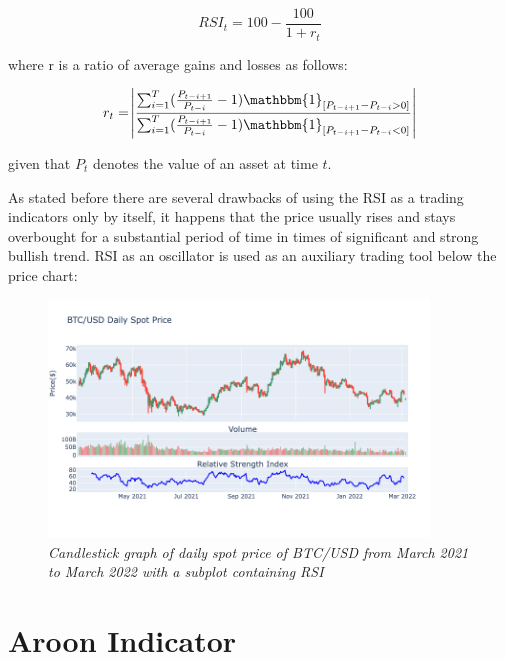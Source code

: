 \begin{equation}
RSI_t = 100- \frac{100}{1+r_t} 
\end{equation}
 
 where r is a ratio of average gains and losses as follows:
 
\begin{equation}
 r_t = \abs{\frac{\sum_{i=1}^{T}(\frac{P_{t-i+1}}{P_{t-i}}-1)\mathbbm{1}_{[P_{t-i+1} - P_{t-i} > 0]}}{\sum_{i=1}^{T}(\frac{P_{t-i+1}}{P_{t-i}}-1) \mathbbm{1}_{[P_{t-i+1} - P_{t-i} < 0]}}}
\end{equation}

given that $P_t$ denotes the value of an asset at time $t$.

As stated before there are several drawbacks of using the RSI as a trading indicators only by itself, it happens that the price usually rises and stays overbought for a substantial period of time in times of significant and strong bullish trend. RSI as an oscillator is used as an auxiliary trading tool below the price chart:

\begin{figure}[ht]

\begin{center}
	\includegraphics[width=0.9\textwidth]{Figs/RSI.png}
\end{center}

\caption{\textit{ Candlestick graph of daily spot price of BTC/USD from March 2021 to March 2022 with a subplot containing  RSI}}

\end{figure}

\section{Aroon Indicator}

